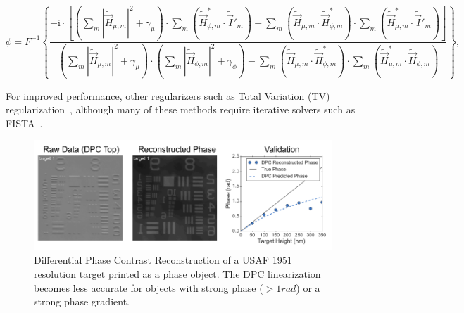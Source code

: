 \begin{equation} \label{eq:Hp_inverse}
\phi = F^{-1}\left\{\frac{-\mathrm{i}\cdot\left[\left(\sum\limits_{m}|\tilde{\vec{H}}_{\mu,m}|^2+\gamma_{\mu}\right)\cdot\sum\limits_{m}\left(\tilde{\vec{H}}^*_{\phi,m}\cdot\tilde{\vec{I}}'_{m}\right)-\sum\limits_{m}\left(\tilde{\vec{H}}_{\mu,m}\cdot\tilde{\vec{H}}^*_{\phi,m}\right)\cdot\sum\limits_{m}\left(\tilde{\vec{H}}^*_{\mu,m}\cdot\tilde{\vec{I}}'_{m}\right)\right]}{\left(\sum\limits_{m}|\tilde{\vec{H}}_{\mu,m}|^2+\gamma_{\mu}\right)\cdot\left(\sum\limits_{m}|\tilde{\vec{H}}_{\phi,m}|^2+\gamma_{\phi}\right)-\sum\limits_{m}\left(\tilde{\vec{H}}_{\mu,m}\cdot\tilde{\vec{H}}^*_{\phi,m}\right)\cdot\sum\limits_{m} \left( \tilde{\vec{H}}^*_{\mu,m}\cdot\tilde{\vec{H}}_{\phi,m} \right )} \right\},
\end{equation}

\noindent For improved performance, other regularizers such as Total Variation (TV) regularization~\cite{osher2005iterative}, although many of these methods require iterative solvers such as FISTA~\cite{beck2009fast}.

\begin{figure}[tbh]
\centering
\includegraphics[width=1.0\textwidth]{figures/fig_phase_dpc_validation_2.pdf}
\caption{\label{fig:dpc_validation}
Differential Phase Contrast Reconstruction of a USAF 1951 resolution target printed as a phase object. The DPC linearization becomes less accurate for objects with strong phase ($> 1 rad$) or a strong phase gradient.}
\end{figure}

